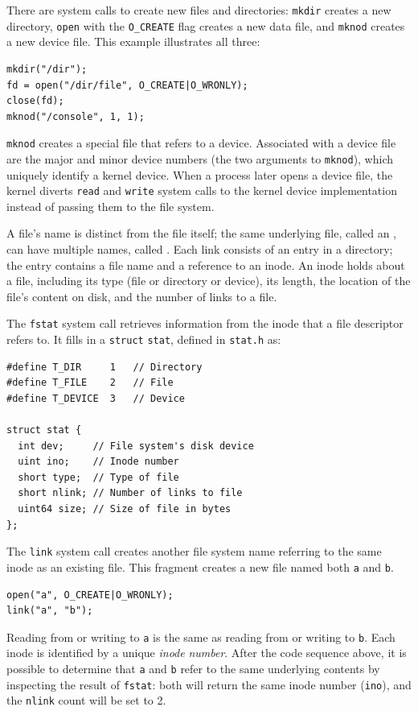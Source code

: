 There are system calls to create new files and directories:
\lstinline{mkdir}
creates a new directory,
\lstinline{open}
with the
\lstinline{O_CREATE}
flag creates a new data file,
and
\lstinline{mknod}
creates a new device file.
This example illustrates all three:
\begin{lstlisting}[]
mkdir("/dir");
fd = open("/dir/file", O_CREATE|O_WRONLY);
close(fd);
mknod("/console", 1, 1);
\end{lstlisting}
\lstinline{mknod}
creates a special file that refers to a device.
Associated with a device file are
the major and minor device numbers
(the two arguments to 
\lstinline{mknod}),
which uniquely identify a kernel device.
When a process later opens a device file, the kernel
diverts
\lstinline{read}
and
\lstinline{write}
system calls to the kernel device implementation
instead of passing them to the file system.

A file's name is distinct from the file itself;
the same underlying file, called an 
, 
can have multiple names,
called 
.
Each link consists of an entry in a directory;
the entry contains a file name and a reference
to an inode.
An inode holds
about a file, including
its type (file or directory or device),
its length,
the location of the file's content on disk,
and the number of links to a file.

The
\lstinline{fstat}
system call
retrieves information from the inode that a
file descriptor refers to.
It fills in a
\lstinline{struct}
\lstinline{stat},
defined in
\lstinline{stat.h} 
as:
\begin{lstlisting}[]
#define T_DIR     1   // Directory
#define T_FILE    2   // File
#define T_DEVICE  3   // Device

struct stat {
  int dev;     // File system's disk device
  uint ino;    // Inode number
  short type;  // Type of file
  short nlink; // Number of links to file
  uint64 size; // Size of file in bytes
};
\end{lstlisting}

The
\lstinline{link}
system call creates another file system name 
referring to the same inode as an existing file.
This fragment creates a new file named both
\lstinline{a}
and
\lstinline{b}.
\begin{lstlisting}[]
open("a", O_CREATE|O_WRONLY);
link("a", "b");
\end{lstlisting}
Reading from or writing to
\lstinline{a}
is the same as reading from or writing to
\lstinline{b}.
Each inode is identified by a unique
\textit{inode}
\textit{number}.
After the code sequence above, it is possible
to determine that
\lstinline{a}
and
\lstinline{b}
refer to the same underlying contents by inspecting the
result of 
\lstinline{fstat}:
both will return the same inode number 
(\lstinline{ino}),
and the
\lstinline{nlink}
count will be set to 2.


